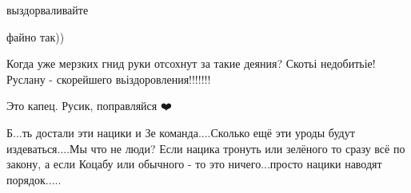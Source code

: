 \begin{itemize}
выздорваливайте

файно так))

Когда уже мерзких гнид руки отсохнут за такие деяния? Скотьі недобитьіе!
Руслану - скорейшего вьіздоровления!!!!!!!

Это капец. Русик, поправляйся ❤️


Б...ть достали эти нацики и Зе команда....Сколько ещё эти уроды будут
издеваться....Мы что не люди?  Если нацика тронуть или зелёного то сразу всё по
закону, а если Коцабу или обычного - то это ничего...просто нацики наводят
порядок.....

\end{itemize}
